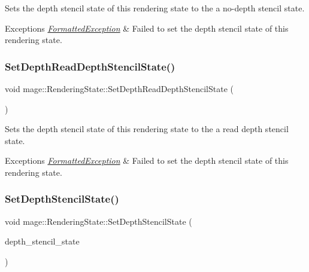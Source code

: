 Sets the depth stencil state of this rendering state to the a no-\/depth stencil state.


\begin{DoxyExceptions}{Exceptions}
{\em \hyperlink{structmage_1_1_formatted_exception}{Formatted\+Exception}} & Failed to set the depth stencil state of this rendering state. \\
\hline
\end{DoxyExceptions}
\hypertarget{structmage_1_1_rendering_state_a86ff2bb5739ada7ffcc275f4624d2a24}{}\label{structmage_1_1_rendering_state_a86ff2bb5739ada7ffcc275f4624d2a24} 
\subsubsection{\texorpdfstring{Set\+Depth\+Read\+Depth\+Stencil\+State()}{SetDepthReadDepthStencilState()}}
{\footnotesize\ttfamily void mage\+::\+Rendering\+State\+::\+Set\+Depth\+Read\+Depth\+Stencil\+State (\begin{DoxyParamCaption}{ }\end{DoxyParamCaption})}

Sets the depth stencil state of this rendering state to the a read depth stencil state.


\begin{DoxyExceptions}{Exceptions}
{\em \hyperlink{structmage_1_1_formatted_exception}{Formatted\+Exception}} & Failed to set the depth stencil state of this rendering state. \\
\hline
\end{DoxyExceptions}
\hypertarget{structmage_1_1_rendering_state_abd2c63744e29e526e145bcacb3e07867}{}\label{structmage_1_1_rendering_state_abd2c63744e29e526e145bcacb3e07867} 
\subsubsection{\texorpdfstring{Set\+Depth\+Stencil\+State()}{SetDepthStencilState()}}
{\footnotesize\ttfamily void mage\+::\+Rendering\+State\+::\+Set\+Depth\+Stencil\+State (\begin{DoxyParamCaption}\item[{I\+D3\+D11\+Depth\+Stencil\+State $\ast$}]{depth\+\_\+stencil\+\_\+state }\end{DoxyParamCaption})}

